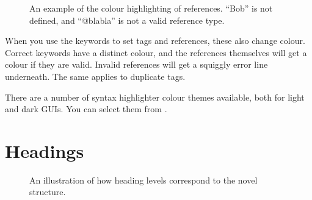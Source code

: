 \documentclass[a4paper,11pt,english]{sphinxmanual}
\begin{document}
\begin{figure}[htbp]
\centering
\capstart

\noindent{}
\caption{An example of the colour highlighting of references. “Bob” is not defined, and “@blabla” is not
a valid reference type.}\label{\detokenize{usage_format:id1}}\end{figure}

\sphinxAtStartPar
When you use the keywords to set tags and references, these also change colour. Correct keywords
have a distinct colour, and the references themselves will get a colour if they are valid. Invalid
references will get a squiggly error line underneath. The same applies to duplicate tags.

\sphinxAtStartPar
There are a number of syntax highlighter colour themes available, both for light and dark GUIs. You
can select them from .


\section{Headings}
\label{\detokenize{usage_format:headings}}\label{\detokenize{usage_format:a-fmt-head}}
\begin{figure}[htbp]
\centering
\capstart

\noindent{}
\caption{An illustration of how heading levels correspond to the novel structure.}\label{\detokenize{usage_format:id2}}\end{figure}
\end{document}
